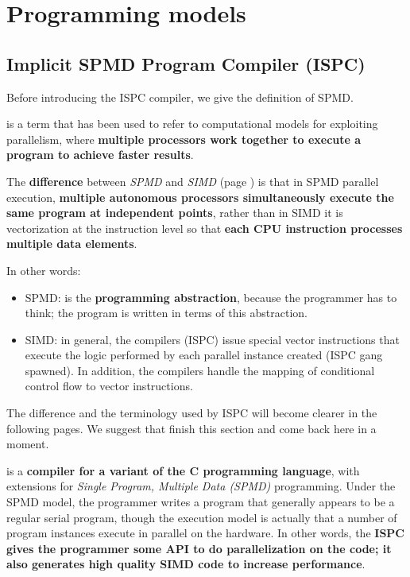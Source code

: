 \section{Programming models}

\subsection{Implicit SPMD Program Compiler (ISPC)}

Before introducing the ISPC compiler, we give the definition of SPMD.

\begin{definitionbox}
     is a term that has been used to refer to computational models for exploiting parallelism, where \textbf{multiple processors work together to execute a program to achieve faster results}.

    The \textbf{difference} between \emph{SPMD} and \emph{SIMD} (page \pageref{subsubsection: Single Instruction, Multiple Data (SIMD) processor}) is that in SPMD parallel execution, \textbf{multiple autonomous processors simultaneously execute the same program at independent points}, rather than in SIMD it is vectorization at the instruction level so that \textbf{each CPU instruction processes multiple data elements}.

    In other words:
    \begin{itemize}
        \item SPMD: is the \textbf{programming abstraction}, because the programmer has to think; the program is written in terms of this abstraction.
        \item SIMD: in general, the compilers (ISPC) issue special vector instructions that execute the logic performed by each parallel instance created (ISPC gang spawned). In addition, the compilers handle the mapping of conditional control flow to vector instructions.
    \end{itemize}
    The difference and the terminology used by ISPC will become clearer in the following pages. We suggest that finish this section and come back here in a moment.
\end{definitionbox}

\begin{definitionbox}\label{definitionbox: Implicit SPMD Program Compiler (ISPC)}
     is a \textbf{compiler for a variant of the C programming language}, with extensions for \emph{Single Program, Multiple Data (SPMD)} programming. Under the SPMD model, the programmer writes a program that generally appears to be a regular serial program, though the execution model is actually that a number of program instances execute in parallel on the hardware. In other words, the \textbf{ISPC gives the programmer some API to do parallelization on the code; it also generates high quality SIMD code to increase performance}.
\end{definitionbox}

